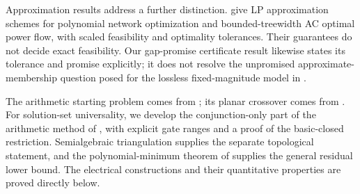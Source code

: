Approximation results address a further distinction.
\citet[Theorem 7 and Corollary 8]{BienstockMunoz2018} give LP approximation
schemes for polynomial network optimization and bounded-treewidth AC optimal
power flow, with scaled feasibility and optimality tolerances. Their
guarantees do not decide exact feasibility. Our gap-promise certificate
result likewise states its tolerance and promise explicitly; it does not
resolve the unpromised approximate-membership question posed for the
lossless fixed-magnitude model in
\citet[Section 1.3]{BienstockVermaPreprint2019}.

The arithmetic starting problem comes from
\citet{AbrahamsenEtAl2018,AbrahamsenEtAl2022}; its planar crossover comes from
\citet{DobbinsEtAl2023}. For solution-set universality, we develop the
conjunction-only part of the arithmetic method of
\citet{AbrahamsenMiltzow2019}, with explicit gate ranges and a proof of the
basic-closed restriction. Semialgebraic triangulation
\citep{OhmotoShiota2017} supplies the separate topological statement, and
the polynomial-minimum theorem of \citet{JeronimoEtAl2013} supplies the
general residual lower bound. The electrical constructions and their
quantitative properties are proved directly below.
